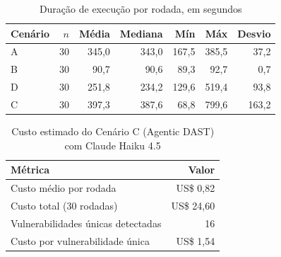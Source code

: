 
\begin{table}[htbp]\centering
\caption{Duração de execução por rodada, em segundos}
\label{tab:duracao-rodadas}
\begin{tabular}{lrrrrrr}
\toprule
\textbf{Cenário} & \textbf{$n$} & \textbf{Média} & \textbf{Mediana} & \textbf{Mín} & \textbf{Máx} & \textbf{Desvio} \\
\midrule
A & 30 & 345,0 & 343,0 & 167,5 & 385,5 & 37,2 \\
B & 30 & 90,7 & 90,6 & 89,3 & 92,7 & 0,7 \\
D & 30 & 251,8 & 234,2 & 129,6 & 519,4 & 93,8 \\
C & 30 & 397,3 & 387,6 & 68,8 & 799,6 & 163,2 \\
\bottomrule\end{tabular}\end{table}
\begin{table}[htbp]\centering
\caption{Custo estimado do Cenário C (Agentic DAST) com Claude Haiku 4.5}
\label{tab:custo-c}
\begin{tabular}{lr}
\toprule
\textbf{Métrica} & \textbf{Valor} \\
\midrule
Custo médio por rodada & US\$ 0,82 \\
Custo total (30 rodadas) & US\$ 24,60 \\
Vulnerabilidades únicas detectadas & 16 \\
Custo por vulnerabilidade única & US\$ 1,54 \\
\bottomrule\end{tabular}\end{table}